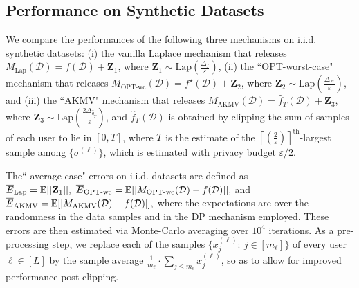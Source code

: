 \subsection{Performance on Synthetic Datasets}
 
We compare the performances of the following three mechanisms on i.i.d. synthetic datasets: (i) the vanilla Laplace mechanism that releases $M_{\text{Lap}}(\mathcal{D}) = f(\mathcal{D})+\mathbf{Z}_1$, where $\mathbf{Z}_1\sim \text{Lap}\left(\frac{\Delta_f}{\varepsilon}\right)$, (ii) the ``OPT-worst-case" mechanism that releases $M_{\text{OPT-wc}}(\mathcal{D}) = f^\star(\mathcal{D})+\mathbf{Z}_2$, where $\mathbf{Z}_2\sim \text{Lap}\left(\frac{\Delta_{f^\star}}{\varepsilon}\right)$, and (iii) the ``AKMV" mechanism \cite[Sec. 3]{amin} that releases $M_{\text{AKMV}}(\mathcal{D}) = \widehat{f}_T(\mathcal{D})+\mathbf{Z}_3$, where $\mathbf{Z}_3\sim \text{Lap}\left(\frac{2\Delta_{\widehat{g}_T}}{\varepsilon}\right)$, and $\widehat{f}_T(\mathcal{D})$ is obtained by clipping the sum of samples of each user to lie in $[0,T]$, where $T$ is the estimate of the $\left \lceil \left(\frac{2}{\varepsilon}\right)\right \rceil^{\text{th}}$-largest sample among $\{\sigma^{(\ell)}\}$, which is estimated with privacy budget $\varepsilon/2$.

The`` average-case" errors on i.i.d. datasets are defined as
$\overline{E}_\text{Lap} = \E[|\mathbf{Z}_1|],\ \overline{E}_\text{OPT-wc} = \E[|M_{\text{OPT-wc}}(\mathcal{D}) - f(\mathcal{D})|],$
and
$ \overline{E}_\text{AKMV} = \mathbb{E}[|M_{\text{AKMV}}(\mathcal{D}) - f(\mathcal{D})|],$
where the expectations are over the randomness in the data samples and in the DP mechanism employed. These errors 
are then estimated via Monte-Carlo averaging over $10^4$ iterations. As a pre-processing step, we replace each of the samples $\{x_j^{(\ell)}:\ j\in [m_\ell]\}$ of every user $\ell \in [L]$ by the sample average $\frac{1}{m_\ell}\cdot \sum_{j\leq m_\ell} x_j^{(\ell)}$, so as to allow for improved performance post clipping. 

